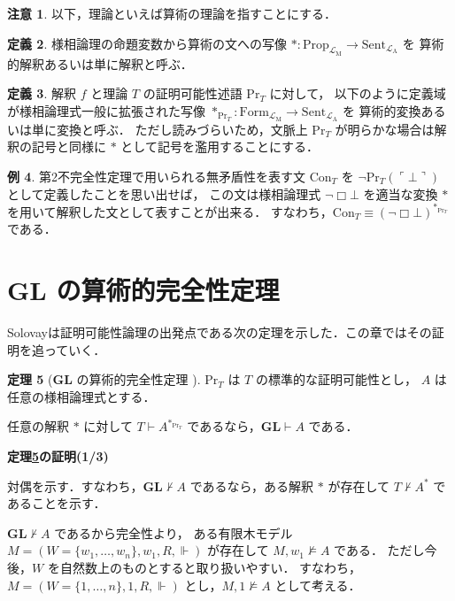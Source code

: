 \documentclass{jsarticle}
\makeatletter
\newcommand*{\Lang}[1]{\mathcal{L}_\mathrm{#1}}
\newcommand*{\LangA}{\Lang{A}}
\newcommand*{\LangM}{\Lang{M}}
\newcommand*{\Logic}[1]{\mathbf{#1}}
\newcommand*{\LogicGL}{\Logic{GL}}
\newcommand*{\Prop}{\mathrm{Prop}}
\newcommand*{\Form}{\mathrm{Form}}
\newcommand*{\Sent}{\mathrm{Sent}}
\newcommand*{\Provable}{\mathrm{Pr}}
\theoremstyle{definition}
\newtheorem{theorem}{定理}[section]
\newtheorem{definition}[theorem]{定義}
\newtheorem{remark}[theorem]{注意}
\newtheorem{example}[theorem]{例}
\renewcommand{\proofname}{証明}
\renewenvironment{proof}[1][\proofname]{\par
    \normalfont 
    \topsep6\p@\@plus6\p@\relax
    \trivlist
    \item\relax
    {\bfseries\gtfamily
    #1\@addpunct{.}}\hspace\labelsep\ignorespaces
    }{%
    \endtrivlist
    \@endpefalse
}
\makeatother
\begin{document}
\begin{remark}
	以下，理論といえば算術の理論を指すことにする．
\end{remark}

\begin{definition}
	様相論理の命題変数から算術の文への写像 $* \colon \Prop_{\LangM} \to \Sent_{\LangA}$ を
	算術的解釈あるいは単に解釈と呼ぶ．
\end{definition}

\begin{definition}
	解釈 $f$ と理論 $T$ の証明可能性述語 $\Provable_T$ に対して，
	以下のように定義域が様相論理式一般に拡張された写像 $*_{\Provable_T} \colon \Form_{\LangM} \to \Sent_{\LangA}$ を
	算術的変換あるいは単に変換と呼ぶ．
	ただし読みづらいため，文脈上 $\Provable_T$ が明らかな場合は解釈の記号と同様に $*$ として記号を濫用することにする．
\end{definition}

\begin{example}
	第2不完全性定理で用いられる無矛盾性を表す文 $\mathrm{Con}_T$ を $\lnot \Provable_T(\ulcorner \bot \urcorner)$ として定義したことを思い出せば，
	この文は様相論理式 $\lnot \Box \bot$ を適当な変換 $*$ を用いて解釈した文として表すことが出来る．
	すなわち，$\mathrm{Con}_T \equiv (\lnot \Box \bot)^{*_{\Provable_T}}$ である．
\end{example}



\section{$\LogicGL$ の算術的完全性定理}

Solovay\cite{solovay_provability_1976}は証明可能性論理の出発点である次の定理を示した．この章ではその証明を追っていく．

\begin{theorem}[$\LogicGL$ の算術的完全性定理 \cite*{solovay_provability_1976}]\label{thm:GL_arith_completeness}
	$\Provable_T$ は $T$ の標準的な証明可能性とし，
	$A$ は任意の様相論理式とする．

	任意の解釈 $*$ に対して $T \vdash A^{*_{\Provable_T}}$ であるなら，$\LogicGL \vdash A$ である．
\end{theorem}

\begin{proof}[定理\ref{thm:GL_arith_completeness}の証明(1/3)]
	対偶を示す．すなわち，$\LogicGL \nvdash A$ であるなら，ある解釈 $*$ が存在して $T \nvdash A^*$ であることを示す．

	$\LogicGL \nvdash A$ であるから完全性より，
	ある有限木モデル $M = (W = \{w_1, \dots, w_n\}, w_1, R, \Vdash)$ が存在して $M,w_1 \nvDash A$ である．
	ただし今後，$W$ を自然数上のものとすると取り扱いやすい．
	すなわち，$M = (W = \{1,\dots,n\}, 1, R, \Vdash)$ とし，$M,1 \nvDash A$ として考える．
\end{proof}
\end{document}

